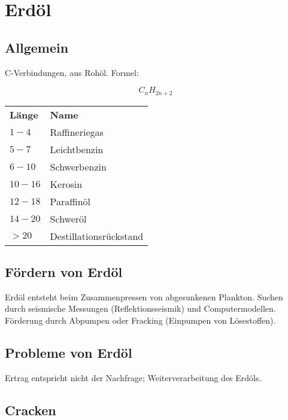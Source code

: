 \section{Erdöl}

\subsection{Allgemein}

\begin{definition}[Erdöl]
	C-Verbindungen, aus Rohöl. Formel:
	
{\large
	\begin{equation}
		C_{n}H_{2n+2}		
	\end{equation}
}

\begin{center}
	\begin{tabular}{ l  l }
		\textbf{Länge} & \textbf{Name} \\
		$1-4$ & Raffineriegas \\
		$5-7$ & Leichtbenzin \\
		$6-10$ & Schwerbenzin \\
		$10-16$ & Kerosin \\
		$12-18$ & Paraffinöl \\
		$14-20$ & Schweröl \\
		$>20$ & Destillationsrückstand
	\end{tabular}
\end{center}
\end{definition}

\subsection{Fördern von Erdöl}

Erdöl entsteht beim Zusammenpressen von abgesunkenen Plankton. Suchen durch seismische Messungen (Reflektionsseismik) und Computermodellen. Förderung durch Abpumpen oder Fracking (Einpumpen von Lösestoffen).

\subsection{Probleme von Erdöl}

Ertrag entspricht nicht der Nachfrage; Weiterverarbeitung des Erdöls.

\subsection{Cracken}

